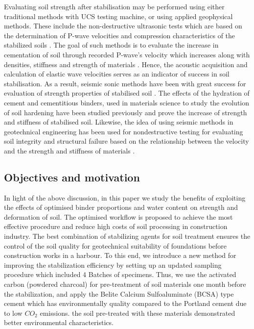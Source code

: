 \documentclass[information,article,submit,pdftex,moreauthors]{Definitions/mdpi}
\begin{document}
Evaluating soil strength after stabilisation may be performed using either traditional methods with UCS testing machine, or using applied geophysical methods. These include the non-destructive ultrasonic tests which are based on the determination of P-wave velocities and compression characteristics of the stabilized soils \cite{Yesiller}. The goal of such methods is to evaluate the increase in cementation of soil through recorded P-wave's velocity which increases along with densities, stiffness and strength of materials \cite{ZHANG2021143,Lindh2023JMBM,Abdi}. Hence, the acoustic acquisition and calculation of elastic wave velocities serves as an indicator of success in soil stabilisation. As a result, seismic sonic methods have been with great success for evaluation of strength properties of stabilised soil \cite{Lopes,Lindh202210,CRISTELO20151}. The effects of the hydration of cement and cementitious binders, used in materials science to study the evolution of soil hardening have been studied previously \cite{Ardah,Sree,su142113736} and prove the increase of strength and stiffness of stabilised soil. Likewise, the idea of using seismic methods in geotechnical engineering has been used for nondestructive testing for evaluating soil integrity and structural failure based on the relationship between the velocity and the strength and stiffness of materials \cite{Yu}.  

\subsection{Objectives and motivation}

In light of the above discussion, in this paper we study the benefits of exploiting the effects of optimised binder proportions and water content on strength and deformation of soil. The optimised workflow is proposed to achieve the most effective procedure and reduce high costs of soil processing in construction industry. The best combination of stabilizing agents for soil treatment ensures the control of the soil quality for geotechnical suitability of foundations before construction works in a harbour. To this end, we introduce a new method for improving the stabilization efficiency by setting up an updated sampling procedure which included 4 Batches of specimens. Thus, we use the activated carbon (powdered charcoal) for pre-treatment of soil materials one month before the stabilization, and apply the Belite Calcium Sulfoaluminate (BCSA) type cement which has environmentally quality compared to the Portland cement due to low $CO_2$ emissions. the soil pre-treated with these materials demonstrated better environmental characteristics. 
\end{document}
